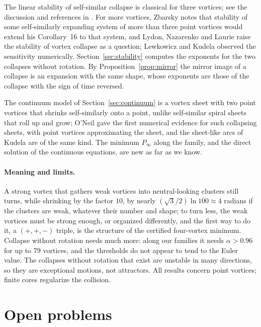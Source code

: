 \documentclass[11pt]{article}
\theoremstyle{definition}
\begin{document}
The linear stability of self-similar collapse is classical for three vortices; see the discussion and references in \cite[Sect.~9]{mw2026}. For more vortices, Zbarsky \cite[p.~20]{zbarsky2024} notes that stability of some self-similarly expanding system of more than three point vortices would extend his Corollary~16 to that system, and Lydon, Nazarenko and Laurie \cite[p.~39]{lnl2022} raise the stability of vortex collapse as a question; Lewkowicz and Kudela \cite{lk2015} observed the sensitivity numerically. Section~\ref{sec:stability} computes the exponents for the two collapses without rotation. By Proposition~\ref{prop:mirror} the mirror image of a collapse is an expansion with the same shape, whose exponents are those of the collapse with the sign of time reversed.

The continuum model of Section~\ref{sec:continuum} is a vortex sheet with two point vortices that shrinks self-similarly onto a point, unlike self-similar spiral sheets that roll up and grow; O'Neil \cite{oneil2010} gave the first numerical evidence for such collapsing sheets, with point vortices approximating the sheet, and the sheet-like arcs of Kudela \cite{kudela2021} are of the same kind. The minimum $P_\infty$ along the family, and the direct solution of the continuous equations, are new as far as we know.

\paragraph{Meaning and limits.} A strong vortex that gathers weak vortices into neutral-looking clusters still turns, while shrinking by the factor $10$, by nearly $(\sqrt{3}/2)\ln 100 \approx 4$ radians if the clusters are weak, whatever their number and shape; to turn less, the weak vortices must be strong enough, or organized differently, and the first way to do it, a $(+,+,-)$ triple, is the structure of the certified four-vortex minimum. Collapse without rotation needs much more: along our families it needs $\alpha > 0.96$ for up to $79$ vortices, and the thresholds do not appear to tend to the Euler value. The collapses without rotation that exist are unstable in many directions, so they are exceptional motions, not attractors. All results concern point vortices; finite cores regularize the collision.

\section{Open problems}\label{sec:open}
\end{document}
